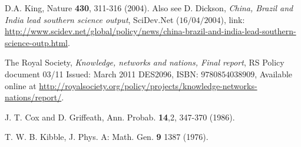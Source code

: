 \documentclass[a4paper,11pt,color]{article}
\renewenvironment{thebibliography}[1]{%
    \begin{oldthebibliography}{#1}%
      \setlength{\parskip}{0ex}%
      \setlength{\itemsep}{0ex}%
  }%
  {%
    \end{oldthebibliography}%
  }
\begin{document}
\begin{thebibliography}{}
D.A. King, Nature {\bf 430}, 311-316 (2004). Also see D. Dickson, \textit{China, Brazil and India lead southern science output}, SciDev.Net ($16/04/2004$), link: \url{http://www.scidev.net/global/policy/news/china-brazil-and-india-lead-southern-science-outp.html}.

The Royal Society, \textit{Knowledge, networks and nations, Final report}, RS Policy document 03/11
Issued: March 2011 DES2096, ISBN: $9780854038909$, Available online at \url{http://royalsociety.org/policy/projects/knowledge-networks-nations/report/}.

J. T. Cox and D. Griffeath, Ann. Probab. {\bf 14},2, 347-370 (1986).

T. W. B. Kibble, J. Phys. A: Math. Gen. {\bf 9} 1387 (1976).

\end{thebibliography}
\end{document}
